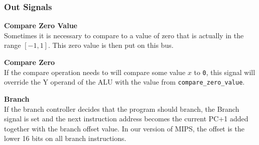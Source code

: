 \subsubsection{Out Signals}

\begin{description}
\item{\textbf{Compare Zero Value}} \\

Sometimes it is necessary to compare to a value of zero that is actually in the range $[-1,1]$.
This zero value is then put on this bus.

\item{\textbf{Compare Zero}} \\

If the compare operation needs to will compare some value $x$ to \texttt{0}, this signal will override the Y operand of the ALU with the value from \texttt{compare\_zero\_value}.

\item{\textbf{Branch}} \\

If the branch controller decides that the program should branch, the Branch signal is set and the next instruction address becomes the current PC+1 added together with the branch offset value.
In our version of MIPS, the offset is the lower 16 bits on all branch instructions.

\end{description}
